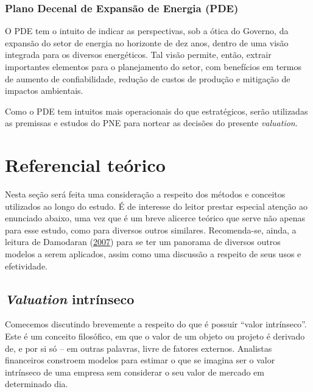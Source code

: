 \documentclass[grad,numbers]{coppe}
\begin{document}
  \hypertarget{plano-decenal-de-expansuxe3o-de-energia-pde}{%
  \subsection{Plano Decenal de Expansão de Energia (PDE)}\label{plano-decenal-de-expansuxe3o-de-energia-pde}}

  O PDE tem o intuito de indicar as perspectivas, sob a ótica do Governo, da expansão do setor de energia no horizonte de dez anos, dentro de uma visão integrada para os diversos energéticos. Tal visão permite, então, extrair importantes elementos para o planejamento do setor, com benefícios em termos de aumento de confiabilidade, redução de custos de produção e mitigação de impactos ambientais.

  Como o PDE tem intuitos mais operacionais do que estratégicos, serão utilizadas as premissas e estudos do PNE para nortear as decisões do presente \emph{valuation}.

  \hypertarget{referencial-teuxf3rico}{%
  \chapter{Referencial teórico}\label{referencial-teuxf3rico}}

  Nesta seção será feita uma consideração a respeito dos métodos e conceitos utilizados ao longo do estudo. É de interesse do leitor prestar especial atenção ao enunciado abaixo, uma vez que é um breve alicerce teórico que serve não apenas para esse estudo, como para diversos outros similares. Recomenda-se, ainda, a leitura de Damodaran (\protect\hyperlink{ref-damodaran2007}{2007}) para se ter um panorama de diversos outros modelos a serem aplicados, assim como uma discussão a respeito de seus usos e efetividade.

  \hypertarget{valuation-intruxednseco}{%
  \section{\texorpdfstring{\emph{Valuation} intrínseco}{Valuation intrínseco}}\label{valuation-intruxednseco}}

  Comecemos discutindo brevemente a respeito do que é possuir ``valor intrínseco''. Este é um conceito filosófico, em que o valor de um objeto ou projeto é derivado de, e por si só -- em outras palavras, livre de fatores externos. Analistas financeiros constroem modelos para estimar o que se imagina ser o valor intrínseco de uma empresa sem considerar o seu valor de mercado em determinado dia.
\end{document}
